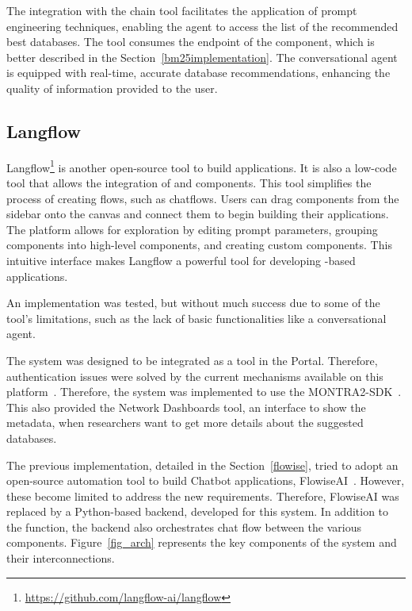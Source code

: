 The integration with the chain tool facilitates the application of prompt engineering techniques, enabling the agent to access the list of the recommended best databases. The tool consumes the endpoint of the {\ir} component, which is better described in the Section~\ref{bm25implementation}. The conversational agent is equipped with real-time, accurate database recommendations, enhancing the quality of information provided to the user. 


\subsection{Langflow}

Langflow\footnote{\url{https://github.com/langflow-ai/langflow}} is another open-source tool to build {\ai} applications. It is also a low-code tool that allows the integration of {\llm} and {\ai} components. This tool simplifies the process of creating flows, such as chatflows. Users can drag components from the sidebar onto the canvas and connect them to begin building their applications. The platform allows for exploration by editing prompt parameters, grouping components into high-level components, and creating custom components. This intuitive interface makes Langflow a powerful tool for developing {\llm}-based applications.

An implementation was tested, but without much success due to some of the tool's limitations, such as the lack of basic functionalities like a conversational agent.

 




The system was designed to be integrated as a tool in the {\ehden} Portal. Therefore, authentication issues were solved by the current mechanisms available on this platform~\cite{almeida2024federated}. Therefore, the system was implemented to use the MONTRA2-SDK~\cite{almeida2024montra2}. This also provided the Network Dashboards tool, an interface to show the metadata, when researchers want to get more details about the suggested databases. 

The previous implementation, detailed in the Section~\ref{flowise}, tried to adopt an open-source automation tool to build Chatbot applications, FlowiseAI~\cite{reis2024flowise}. However, these become limited to address the new requirements. Therefore, FlowiseAI was replaced by a Python-based backend, developed for this system. In addition to the {\ir} function, the backend also orchestrates chat flow between the various components. Figure~\ref{fig_arch} represents the key components of the system and their interconnections.

